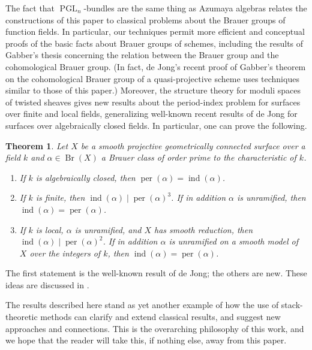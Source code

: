 \documentclass[11pt]{amsart}
\newcommand{\PGL}{\operatorname{PGL}}
\DeclareMathOperator{\per}{per}
\DeclareMathOperator{\ind}{ind}
\renewcommand{\[}{[\!\hspace{0.03em}[}
\renewcommand{\]}{]\!\hspace{0.03em}]}
\renewcommand{\(}{(\!\hspace{0.03em}(}
\renewcommand{\)}{)\!\hspace{0.03em})}
\DeclareMathOperator{\Br}{\operatorname{Br}}
\newtheorem*{theorem}{Theorem}
\theoremstyle{definition}
\theoremstyle{remark}
\begin{document}
The fact that $\PGL _ n$-bundles are the same thing as Azumaya algebras relates the constructions of this paper to classical problems about the Brauer groups of function fields.  In particular, our techniques permit more efficient and conceptual proofs of the basic facts about Brauer groups of schemes, including the results of Gabber's thesis concerning the relation between the Brauer group and the cohomological Brauer group.  (In fact, de Jong's recent proof of Gabber's theorem on the cohomological Brauer group of a quasi-projective scheme uses techniques similar to those of this paper.) Moreover, the structure theory for moduli spaces of twisted sheaves gives new results about the period-index problem for surfaces over finite and local fields, generalizing well-known recent results of de Jong for surfaces over algebraically closed fields.  In particular, one can prove the following.

\begin{theorem}
Let $X$ be a smooth projective geometrically connected surface over a field $k$ and $\alpha \in \Br (X)$ a Brauer class of order prime to the characteristic of $k$.
\begin{enumerate}

\item If $k$ is algebraically closed, then $\per (\alpha) = \ind (\alpha)$.

\item If $k$ is finite, then $\ind (\alpha) \mid \per (\alpha) ^ 3$.  If in addition $\alpha$ is unramified, then $\ind (\alpha) = \per (\alpha)$.

\item If $k$ is local, $\alpha$ is unramified, and $X$ has smooth reduction, then $\ind (\alpha) \mid \per (\alpha) ^ 2$.  If in addition $\alpha$ is unramified on a smooth model of $X$ over the integers of $k$, then $\ind (\alpha) = \per (\alpha)$.
\end{enumerate}
\end{theorem}
\noindent The first statement is the well-known result of de Jong; the others are new.  These ideas are discussed in \cite {period-index-paper}.

The results described here stand as yet another example of how the use of stack-theoretic methods can clarify and extend classical results, and suggest new approaches and connections.  This is the overarching philosophy of this work, and we hope that the reader will take this, if nothing else, away from this paper.
\end{document}
